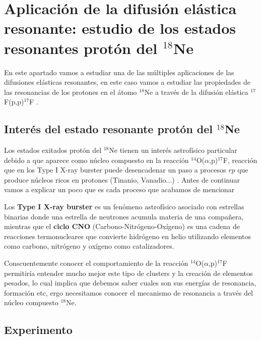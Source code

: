 \documentclass[fleqn,11pt]{SelfArx} %
\begin{document}
\section{Aplicación de la difusión elástica resonante: estudio de los estados resonantes protón del $^{18}$Ne}

En este apartado vamos a estudiar una de las múltiples aplicaciones de las difusiones elásticas resonantes, en este caso vamos a estudiar las propiedades de las resonancias de los protones en el átomo $^{18}$Ne a través de la difusión elástica $^{17}$F(p,p)$^{17}$F \cite{17Fp}.

\subsection{Interés del estado resonante protón del $^{18}$Ne }

Los estados exitados protón del $^{18}$Ne tienen un interés astrofísico particular debido a que aparece como núcleo compuesto en la reacción $^{14}$O($\alpha$,p)$^{17}$F, reacción que en los Type I X-ray burster puede desencadenar un paso a procesos $rp$ que produce núcleos ricos en protones (Tinanio, Vanadio...) \cite{Astrophysics}. Antes de continuar vamos a explicar un poco que es cada proceso que acabamos de mencionar

Los \textbf{Type I X-ray burster} es un fenómeno astrofísico asociado con estrellas binarias donde una estrella de neutrones acumula materia de una compañera, mientras que el \textbf{ciclo CNO} (Carbono-Nitrógeno-Oxígeno) es una cadena de reacciones termonucleares que convierte hidrógeno en helio utilizando elementos como carbono, nitrógeno y oxígeno  como catalizadores.

Conscuentemente conocer el comportamiento de la reacción  $^{14}$O($\alpha$,p)$^{17}$F permitiría entender mucho mejor este tipo de clusters y la creación de elementos pesados, lo cual implica que debemos saber cuales son sus energías de resonancia, formación etc, ergo necesitamos conocer el mecanismo de resonancia a través del núcleo compuesto $^{18}$Ne.
	
\subsection{Experimento}
\end{document}
